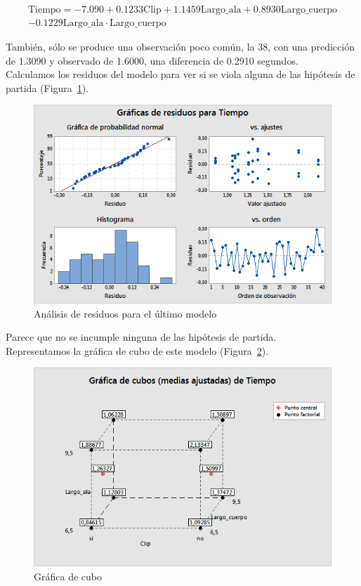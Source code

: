 \documentclass[12pt,a4paper,twoside,openright,titlepage,final]{article}
\begin{document}
\begin{multline*}
\text{Tiempo} = -7.090 + 0.1233 \text{Clip} + 1.1459 \text{Largo\_ala} + 0.8930 \text{Largo\_cuerpo} \\
- 0.1229 \text{Largo\_ala} \cdot \text{Largo\_cuerpo}
\end{multline*}

También, sólo se produce una observación poco común, la 38, con una predicción de 1.3090 y observado de 1.6000, una diferencia de 0.2910 segundos.\\

Calculamos los residuos del modelo para ver si se viola alguna de las hipótesis de partida (Figura~\ref{fig:residuos_4}).\\

\begin{figure}[htbp!]
	\centering
	\includegraphics[width=0.7\linewidth]{imagenes/Experimento_fraccional/Graficas_de_residuos_para_Tiempo_4}
	\caption{Análisis de residuos para el último modelo}
	\label{fig:residuos_4}
\end{figure}

Parece que no se incumple ninguna de las hipótesis de partida.\\

Representamos la gráfica de cubo de este modelo (Figura~\ref{fig:cubo_fraccional}).\\

\begin{figure}[htbp!]
	\centering
	\includegraphics[width=0.7\linewidth]{imagenes/Experimento_fraccional/Grafica_de_cubos_(medias_ajustadas)_de_Tiempo_4}
	\caption{Gráfica de cubo}
	\label{fig:cubo_fraccional}
\end{figure}
\end{document}
